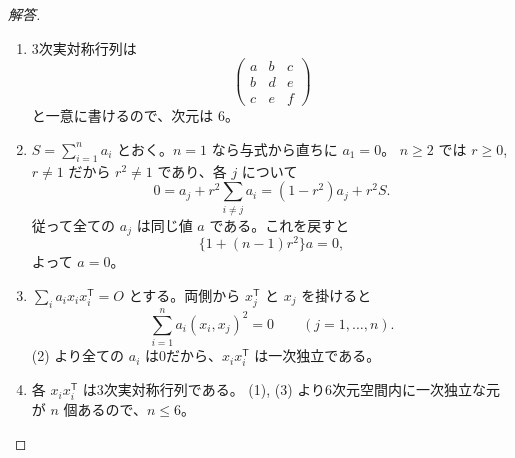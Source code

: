\begin{proof}[解答]
\begin{enumerate}
  \item[(1)] 3次実対称行列は
  \[
  \begin{pmatrix}a&b&c\\b&d&e\\c&e&f\end{pmatrix}
  \]
  と一意に書けるので、次元は $6$。

  \item[(2)] $S=\sum_{i=1}^na_i$ とおく。$n=1$ なら与式から直ちに $a_1=0$。
  $n\ge2$ では $r\ge0$, $r\ne1$ だから $r^2\ne1$ であり、各 $j$ について
  \[
  0=a_j+r^2\sum_{i\ne j}a_i=(1-r^2)a_j+r^2S.
  \]
  従って全ての $a_j$ は同じ値 $a$ である。これを戻すと
  \[
  \{1+(n-1)r^2\}a=0,
  \]
  よって $a=0$。

  \item[(3)] $\sum_i a_ix_ix_i^{\mathsf T}=O$ とする。両側から
  $x_j^{\mathsf T}$ と $x_j$ を掛けると
  \[
  \sum_{i=1}^na_i(x_i,x_j)^2=0\qquad(j=1,\ldots,n).
  \]
  (2) より全ての $a_i$ は0だから、$x_ix_i^{\mathsf T}$ は一次独立である。

  \item[(4)] 各 $x_ix_i^{\mathsf T}$ は3次実対称行列である。
  (1), (3) より6次元空間内に一次独立な元が $n$ 個あるので、$n\le6$。
\end{enumerate}
\end{proof}

